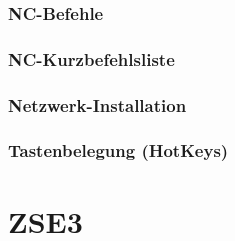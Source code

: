 \documentclass[14pt,a4paper]{book}
\begin{document}
	\section{NC-Befehle} 
	\section{NC-Kurzbefehlsliste} 
	\section{Netzwerk-Installation} 
	\section{Tastenbelegung (HotKeys)} 
 
 
\part{ZSE3}
\end{document}
